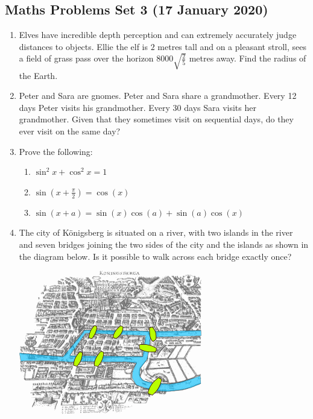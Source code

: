 \documentclass[a4paper]{article}
\begin{document}
\begin{center}
        \section*{Maths Problems Set 3 (17 January 2020)}
\end{center}

\begin{enumerate}
    \item
    Elves have incredible depth perception and can extremely accurately judge distances to objects. Ellie the elf is $2$ metres tall and on a pleasant stroll, sees a field of grass pass over the horizon $8000 \sqrt{\frac{2}{5}}$ metres away. Find the radius of the Earth.

    \item
    Peter and Sara are gnomes. Peter and Sara share a grandmother. Every 12 days Peter visits his grandmother. Every 30 days Sara visits her grandmother. Given that they sometimes visit on sequential days, do they ever visit on the same day?
    
    \item
    Prove the following:
    \begin{enumerate}
        \item $\sin^2 x + \cos^2 x = 1$
        \item $\sin(x + \frac{\pi}{2}) = \cos(x)$
        \item $\sin(x + a) = \sin (x) \cos (a) + \sin (a) \cos (x)$
    \end{enumerate}
    
    \item
    The city of Königsberg is situated on a river, with two islands in the river and seven bridges joining the two sides of the city and the islands as shown in the diagram below. Is it possible to walk across each bridge exactly once?
    
    \includegraphics[scale=0.5]{konigsberg_bridges.png}
    

\end{enumerate}
\end{document}
